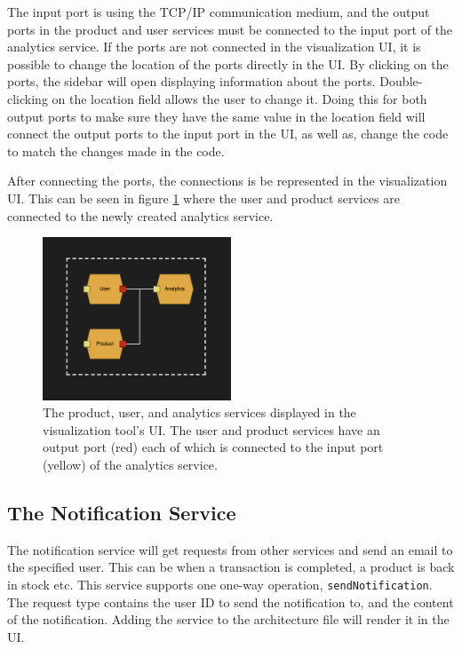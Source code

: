 The input port is using the TCP/IP communication medium, and the output ports in the product and user services must be connected to the input port of the analytics service.
If the ports are not connected in the visualization UI, it is possible to change the location of the ports directly in the UI.
By clicking on the ports, the sidebar will open displaying information about the ports. Double-clicking on the location field allows the user to change it.
Doing this for both output ports to make sure they have the same value in the location field will connect the output ports to the input port in the UI, as well as, change the code to match the changes made in the code.

After connecting the ports, the connections is be represented in the visualization UI. This can be seen in figure \ref*{figure:jv_analytics} where the user and product services are connected to the newly created analytics service.

\begin{figure}[h!]
    \center
    \includegraphics[width=0.5\textwidth]{figures/jv_analytics.png}
    \caption{The product, user, and analytics services displayed in the visualization tool's UI. The user and product services have an output port (red) each of which is connected to the input port (yellow) of the analytics service.}
    \label{figure:jv_analytics}
\end{figure}

\subsection{The Notification Service}
The notification service will get requests from other services and send an email to the specified user. This can be when a transaction is completed, a product is back in stock etc.
This service supports one one-way operation, \texttt{sendNotification}. The request type contains the user ID to send the notification to, and the content of the notification.
Adding the service to the architecture file will render it in the UI.

